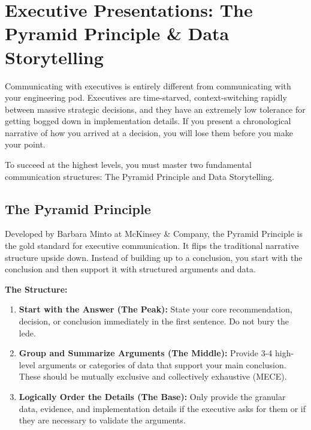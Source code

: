 \bigskip

\section{Executive Presentations: The Pyramid Principle \& Data
Storytelling}\label{executive-presentations-the-pyramid-principle-data-storytelling}

Communicating with executives is entirely different from communicating
with your engineering pod. Executives are time-starved,
context-switching rapidly between massive strategic decisions, and they
have an extremely low tolerance for getting bogged down in
implementation details. If you present a chronological narrative of how
you arrived at a decision, you will lose them before you make your
point.

To succeed at the highest levels, you must master two fundamental
communication structures: The Pyramid Principle and Data Storytelling.

\subsection{The Pyramid Principle}\label{the-pyramid-principle}

Developed by Barbara Minto at McKinsey \& Company, the Pyramid Principle
is the gold standard for executive communication. It flips the
traditional narrative structure upside down. Instead of building up to a
conclusion, you start with the conclusion and then support it with
structured arguments and data.

\textbf{The Structure:}

\begin{enumerate}
\def\labelenumi{\arabic{enumi}.}
\tightlist
\item
  \textbf{Start with the Answer (The Peak):} State your core
  recommendation, decision, or conclusion immediately in the first
  sentence. Do not bury the lede.
\item
  \textbf{Group and Summarize Arguments (The Middle):} Provide 3-4
  high-level arguments or categories of data that support your main
  conclusion. These should be mutually exclusive and collectively
  exhaustive (MECE).
\item
  \textbf{Logically Order the Details (The Base):} Only provide the
  granular data, evidence, and implementation details if the executive
  asks for them or if they are necessary to validate the arguments.
\end{enumerate}

